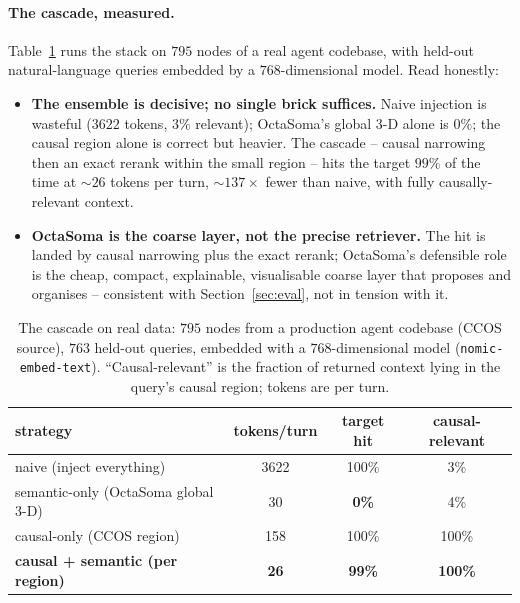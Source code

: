 \documentclass[11pt]{article}
\begin{document}
\paragraph{The cascade, measured.} Table~\ref{tab:cascade} runs the stack on
$795$ nodes of a real agent codebase, with held-out natural-language queries
embedded by a $768$-dimensional model. Read honestly:
\begin{itemize}
  \item \textbf{The ensemble is decisive; no single brick suffices.} Naive
  injection is wasteful ($3622$ tokens, $3\%$ relevant); OctaSoma's global 3-D
  alone is $0\%$; the causal region alone is correct but heavier. The cascade --
  causal narrowing then an exact rerank within the small region -- hits the target
  $99\%$ of the time at ${\sim}26$ tokens per turn, ${\sim}137\times$ fewer than
  naive, with fully causally-relevant context.
  \item \textbf{OctaSoma is the coarse layer, not the precise retriever.} The hit
  is landed by causal narrowing plus the exact rerank; OctaSoma's defensible role
  is the cheap, compact, explainable, visualisable coarse layer that proposes and
  organises -- consistent with Section~\ref{sec:eval}, not in tension with it.
\end{itemize}

\begin{table}[t]
\centering
\caption{The cascade on real data: $795$ nodes from a production agent codebase
(CCOS source), $763$ held-out queries, embedded with a $768$-dimensional model
(\texttt{nomic-embed-text}). ``Causal-relevant'' is the fraction of returned
context lying in the query's causal region; tokens are per turn.}
\label{tab:cascade}
\begin{tabular}{lccc}
\toprule
strategy & tokens/turn & target hit & causal-relevant \\
\midrule
naive (inject everything)               & 3622        & 100\%         & 3\%            \\
semantic-only (OctaSoma global 3-D)     & 30          & \textbf{0\%}  & 4\%            \\
causal-only (CCOS region)               & 158         & 100\%         & 100\%          \\
\textbf{causal + semantic (per region)} & \textbf{26} & \textbf{99\%} & \textbf{100\%} \\
\bottomrule
\end{tabular}
\end{table}
\end{document}
